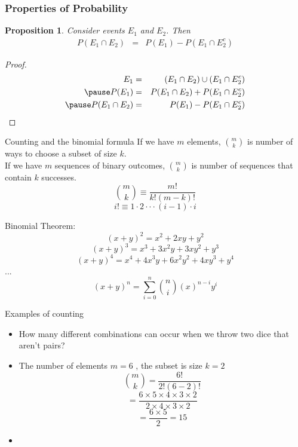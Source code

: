 \documentclass[handout]{beamer}
\newtheorem{prop}{Proposition}
\numberwithin{equation}{section}
\begin{document}
\begin{frame}
\frametitle{Properties of Probability} 
\begin{prop}
Consider events $E_{1}$ and $E_{2}$.  Then 
\begin{eqnarray}
P(E_{1} \cap E_{2} ) & = & P(E_{1} ) - P(E_{1} \cap E_{2}^{c}) \nonumber 
\end{eqnarray}
\end{prop}

\pause 
\begin{proof}
\begin{eqnarray}
E_{1} & = & (E_{1} \cap E_{2}) \cup (E_{1} \cap E_{2}^{c}) \nonumber \\ \pause 
P(E_{1}) & = & P(E_{1} \cap E_{2} )  + P(E_{1} \cap E_{2}^{c} ) \nonumber \\  \pause 
P(E_{1} \cap E_{2} ) & = &  P(E_{1} ) - P(E_{1} \cap E_{2}^{c} ) \nonumber  
\end{eqnarray}




\end{proof}


\end{frame}


\begin{frame}{Counting and the binomial formula}
If we have $m$ elements, ${{m}\choose{k}}$ is number of ways to choose a subset of size $k$.\\
If we have $m$ sequences of binary outcomes, ${{m}\choose{k}}$ is number of sequences that contain $k$ successes.\\
$${{m}\choose{k}}\equiv\frac{m!}{k!(m-k)!}$$
$$i!\equiv1\cdot2\cdot\cdot\cdot(i-1)\cdot i$$

\pause
Binomial Theorem: 
$$(x+y)^2= x^2+2xy+y^2$$
$$(x+y)^3= x^3+3x^2y+3xy^2+y^3$$
$$(x+y)^4= x^4+4x^3y+6x^2y^2+4xy^3+y^4$$
$...$
$$(x+ y)^{n} = \sum_{i=0}^{n} {{n}\choose {i}} (x)^{n- i} y^{i} $$
\end{frame}



\begin{frame}{Examples of counting}
\begin{itemize}
\item How many different combinations can occur when we throw two dice that aren't pairs?
\item The number of elements $m = 6$ , the subset is size $k=2$\pause
$${{m}\choose{k}}=\frac{6!}{2!(6-2)!}$$\pause
$$=\frac{6\times5\times4\times3\times2}{2\times4\times3\times2}$$
$$=\frac{6\times5}{2}=15$$
\item 
\end{itemize}
\end{frame}
\end{document}
